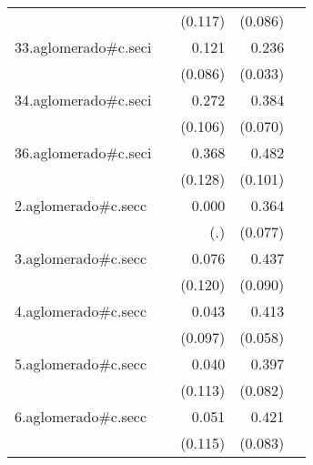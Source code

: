 {\begin{longtable}{l*{4}{D{.}{.}{-1}}}
            &                     &     (0.117)         &     (0.086)         &                     \\
\addlinespace
33.aglomerado#c.seci&                     &       0.121         &       0.236\sym{***}&                     \\
            &                     &     (0.086)         &     (0.033)         &                     \\
\addlinespace
34.aglomerado#c.seci&                     &       0.272\sym{*}  &       0.384\sym{***}&                     \\
            &                     &     (0.106)         &     (0.070)         &                     \\
\addlinespace
36.aglomerado#c.seci&                     &       0.368\sym{**} &       0.482\sym{***}&                     \\
            &                     &     (0.128)         &     (0.101)         &                     \\
\addlinespace
2.aglomerado#c.secc&                     &       0.000         &       0.364\sym{***}&                     \\
            &                     &         (.)         &     (0.077)         &                     \\
\addlinespace
3.aglomerado#c.secc&                     &       0.076         &       0.437\sym{***}&                     \\
            &                     &     (0.120)         &     (0.090)         &                     \\
\addlinespace
4.aglomerado#c.secc&                     &       0.043         &       0.413\sym{***}&                     \\
            &                     &     (0.097)         &     (0.058)         &                     \\
\addlinespace
5.aglomerado#c.secc&                     &       0.040         &       0.397\sym{***}&                     \\
            &                     &     (0.113)         &     (0.082)         &                     \\
\addlinespace
6.aglomerado#c.secc&                     &       0.051         &       0.421\sym{***}&                     \\
            &                     &     (0.115)         &     (0.083)         &                     \\

\end{longtable}}
